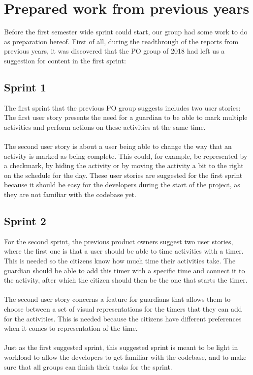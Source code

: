 \section{Prepared work from previous years}\label{prepared-work-from-previous-years}
Before the first semester wide sprint could start, our group had some work to do as preparation hereof.
First of all, during the readthrough of the reports from previous years, it was discovered that the PO group of 2018 had left us a suggestion for content in the first sprint:

\subsection{Sprint 1}
The first sprint that the previous PO group suggests includes two user stories:
The first user story presents the need for a guardian to be able to mark multiple activities and perform actions on these activities at the same time.
\\\\
The second user story is about a user being able to change the way that an activity is marked as being complete.
This could, for example, be represented by a checkmark, by hiding the activity or by moving the activity a bit to the right on the schedule for the day.
These user stories are suggested for the first sprint because it should be easy for the developers during the start of the project, as they are not familiar with the codebase yet.

\subsection{Sprint 2}
For the second sprint, the previous product owners suggest two user stories, where the first one is that a user should be able to time activities with a timer.
This is needed so the citizens know how much time their activities take.
The guardian should be able to add this timer with a specific time and connect it to the activity, after which the citizen should then be the one that starts the timer.
\\\\
The second user story concerns a feature for guardians that allows them to choose between a set of visual representations for the timers that they can add for the activities.
This is needed because the citizens have different preferences when it comes to representation of the time.
\\\\
Just as the first suggested sprint, this suggested sprint is meant to be light in workload to allow the developers to get familiar with the codebase, and to make sure that all groups can finish their tasks for the sprint.


